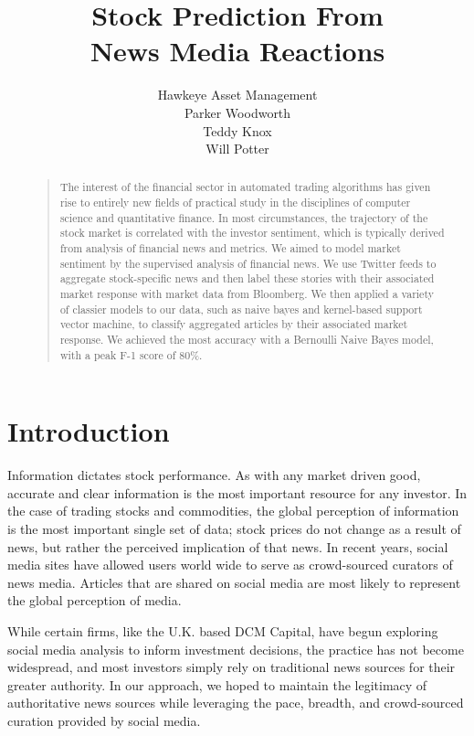 \documentclass[letterpaper]{article}
\begin{document}
\title{Stock Prediction From\\ News Media Reactions}
\author{Hawkeye Asset Management\\
Parker Woodworth\\
Teddy Knox\\
Will Potter\\
}
\maketitle
\begin{abstract}
\begin{quote}
The interest of the financial sector in automated trading algorithms has given rise to entirely new fields of practical study in the disciplines of computer science and quantitative finance. In most circumstances, the trajectory of the stock market is correlated with the investor sentiment, which is typically derived from analysis of financial news and metrics. We aimed to model market sentiment by the supervised analysis of financial news. We use Twitter feeds to aggregate stock-specific news and then label these stories with their associated market response with market data from Bloomberg. We then applied a variety of classier models to our data, such as naive bayes and kernel-based support vector machine, to classify aggregated articles by their associated market response. We achieved the most accuracy with a Bernoulli Naive Bayes model, with a peak F-1 score of 80\%.
\end{quote}
\end{abstract}

\section{Introduction}
\noindent Information dictates stock performance. As with any market driven good, accurate and clear information is the most important resource for any investor. In the case of trading stocks and commodities, the global perception of information is the most important single set of data; stock prices do not change as a result of news, but rather the perceived implication of that news. In recent years, social media sites have allowed users world wide to serve as crowd-sourced curators of news media. Articles that are shared on social media are most likely to represent the global perception of media.

While certain firms, like the U.K. based DCM Capital, have begun exploring social media analysis to inform investment decisions, the practice has not become widespread, and most investors simply rely on traditional news sources for their greater authority. In our approach, we hoped to maintain the legitimacy of authoritative news sources while leveraging the pace, breadth, and crowd-sourced curation provided by social media.
\end{document}
